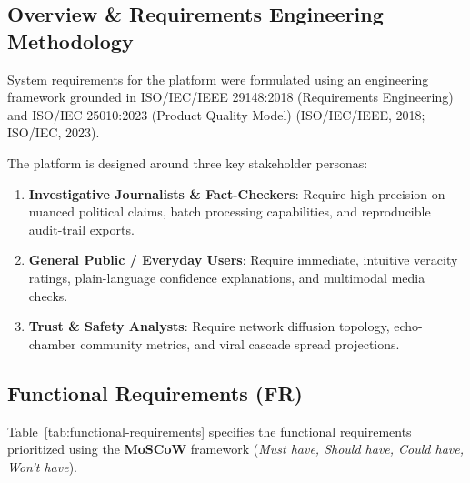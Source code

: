 \documentclass[11pt, a4paper]{article}
\begin{document}
\subsection{Overview \& Requirements Engineering Methodology}
System requirements for the platform were formulated using an engineering framework grounded in ISO/IEC/IEEE 29148:2018 (Requirements Engineering) and ISO/IEC 25010:2023 (Product Quality Model) (ISO/IEC/IEEE, 2018; ISO/IEC, 2023).

The platform is designed around three key stakeholder personas:
\begin{enumerate}
  \item \textbf{Investigative Journalists \& Fact-Checkers}: Require high precision on nuanced political claims, batch processing capabilities, and reproducible audit-trail exports.
  \item \textbf{General Public / Everyday Users}: Require immediate, intuitive veracity ratings, plain-language confidence explanations, and multimodal media checks.
  \item \textbf{Trust \& Safety Analysts}: Require network diffusion topology, echo-chamber community metrics, and viral cascade spread projections.
\end{enumerate}

\subsection{Functional Requirements (FR)}
Table~\ref{tab:functional-requirements} specifies the functional requirements prioritized using the \textbf{MoSCoW} framework (\emph{Must have, Should have, Could have, Won't have}).
\end{document}
